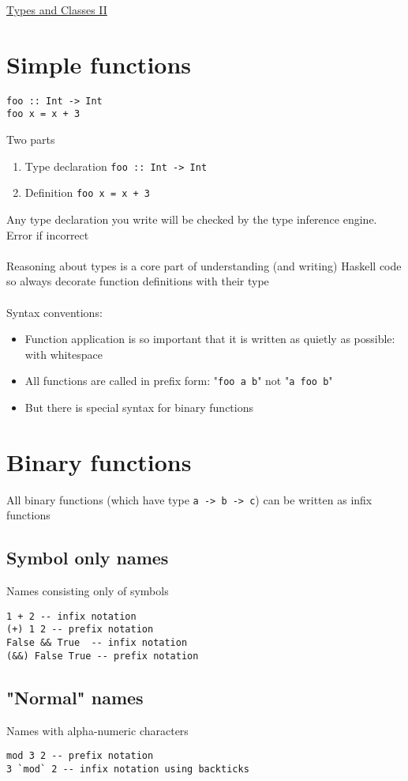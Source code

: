 \documentclass{article}[18pt]
\begin{document}
\begin{center}
\underline{\huge Types and Classes II}
\end{center}
\section{Simple functions}
\begin{verbatim}
foo :: Int -> Int
foo x = x + 3
\end{verbatim}
Two parts
\begin{enumerate}
	\item Type declaration \texttt{foo :: Int -> Int}
	\item Definition \texttt{foo x = x + 3}
\end{enumerate}
Any type declaration you write will be checked by the type inference engine. Error if incorrect\\
\\
Reasoning about types is a core part of understanding (and writing) Haskell code so always decorate function definitions with their type\\
\\
Syntax conventions:
\begin{itemize}
	\item Function application is so important that it is written as quietly as possible: with whitespace
	\item All functions are called in prefix form: "\texttt{foo a b}" not "\texttt{a foo b}"
	\item But there is special syntax for binary functions
\end{itemize}
\section{Binary functions}
All binary functions (which have type \texttt{a -> b -> c}) can be written as infix functions
\subsection{Symbol only names}
Names consisting only of symbols
\begin{verbatim}
1 + 2 -- infix notation
(+) 1 2 -- prefix notation
False && True  -- infix notation
(&&) False True -- prefix notation
\end{verbatim}
\subsection{"Normal" names}
Names with alpha-numeric characters
\begin{verbatim}
mod 3 2 -- prefix notation
3 `mod` 2 -- infix notation using backticks
\end{verbatim}
\end{document}
